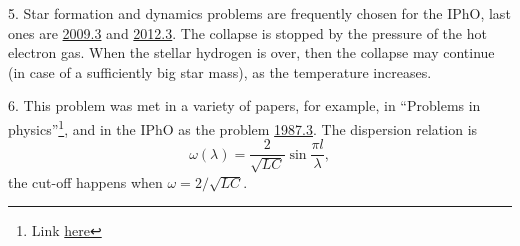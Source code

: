 \documentclass[12pt,a4paper,pdflatex]{disser}
\begin{document}
5. Star formation and dynamics problems are frequently chosen for the IPhO, last ones are \href{http://ipho.phy.ntnu.edu.tw/problems-and-solutions/2009/IPhO_2009_Theo_Problem 3.pdf}{2009.3} and \href{http://ipho.phy.ntnu.edu.tw/problems-and-solutions/2012/2012-08-09 IPhO2012_Theoretical_problems.pdf}{2012.3}. The collapse is stopped by the pressure of the hot electron gas. When the stellar hydrogen is over, then the collapse may continue (in case of a sufficiently big star mass), as the temperature increases.

6. This problem was met in a variety of papers, for example, in ``Problems in physics''\footnote{Link \href{http://zfmsh.nsu.ru/zfmsh/html/biblio/articles/phys/zadach.pdf}{here}}, and in the IPhO as the problem \href{http://ipho.phy.ntnu.edu.tw/problems-and-solutions/1987/18th_IPhO_1987.pdf}{1987.3}. The dispersion relation is
$$
  \omega(\lambda)=\frac{2}{\sqrt{LC}}\sin\frac{\pi l}{\lambda},
$$
the cut-off happens when $\omega=2/\sqrt{LC}$.
\end{document}
